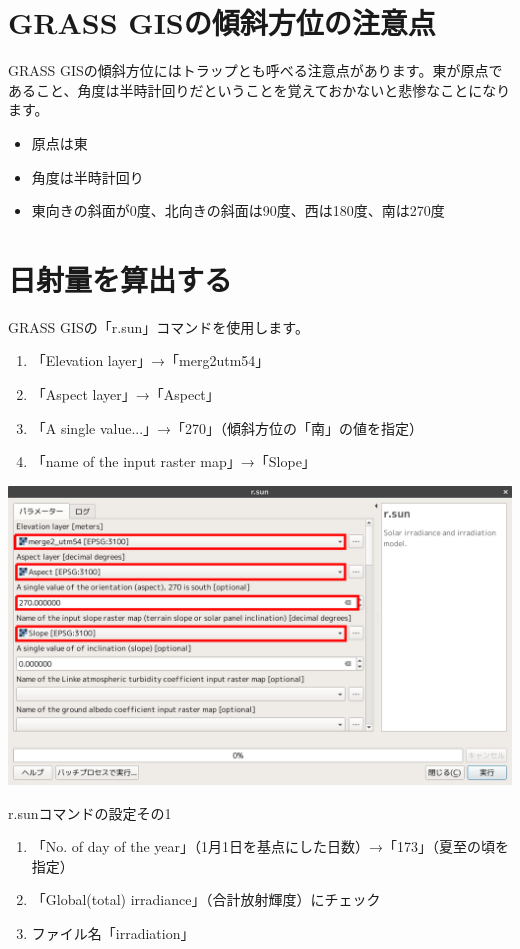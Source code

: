 \documentclass[14Q,twocolumn]{jsarticle}
\makeatletter
\newenvironment{figurehere}
  {\def\@captype{figure}}
  {}
\makeatother
\begin{document}
\section{GRASS GISの傾斜方位の注意点}
GRASS GISの傾斜方位にはトラップとも呼べる注意点があります。東が原点であること、角度は半時計回りだということを覚えておかないと悲惨なことになります。

\begin{itemize}
\item 原点は東
\item 角度は半時計回り
\item  東向きの斜面が0度、北向きの斜面は90度、西は180度、南は270度
\end{itemize}


\section{日射量を算出する}
GRASS GISの「r.sun」コマンドを使用します。

\begin{enumerate}
\item 「Elevation layer」→「merg2utm54」
\item 「Aspect layer」→「Aspect」
\item 「A single value...」→「270」（傾斜方位の「南」の値を指定）
\item 「name of the input raster map」→「Slope」
\end{enumerate}

\begin{figurehere}
\centering
\includegraphics[width=1\linewidth]{18.png}
\caption{r.sunコマンドの設定その1}
\end{figurehere}


\begin{enumerate}
\item 「No. of day of the year」（1月1日を基点にした日数）→「173」（夏至の頃を指定） 
\item 「Global(total) irradiance」（合計放射輝度）にチェック
\item  ファイル名「irradiation」
\end{enumerate}
\end{document}
